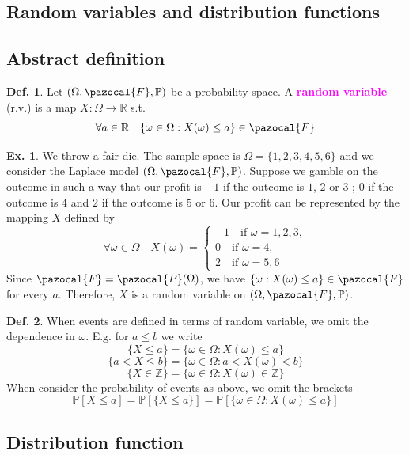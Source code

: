 \documentclass[8pt,a4paper,landscape]{article}
\theoremstyle{definition}
\newtheorem{definition}{Def.}[section]
\theoremstyle{example}
\newtheorem{example}{Ex.}[section]
\theoremstyle{intuition}
\theoremstyle{definition}
\newcommand{\Fb}{\pazocal{F}}
\newcommand{\Pb}{\pazocal{P}}
\newcommand{\mydef}[1]{\textcolor{magenta}{\textbf{#1}}}
\newcommand{\prob}[1]{\mathbb{P}\left[ #1 \right]}
\begin{document}
\begin{multicols}{3}
	\newpage
	\section{Random variables and distribution functions}
			\subsection{Abstract definition}
			
				\begin{definition}
					Let $(\Omega, \Fb, \mathbb{P})$ be a probability space. A \mydef{random variable} (r.v.) is a map $X : \Omega \to \mathbb{R}$ s.t.
					$$						
						\forall a \in \mathbb{R} \quad \{\omega \in \Omega : X(\omega) \leq a\} \in \Fb
					$$
				\end{definition}
				
				\begin{example}
					We throw a fair die. The sample space is $\Omega = \{1,2,3,4,5,6\}$ and we consider the Laplace model $(\Omega, \Fb, \mathbb{P})$. Suppose we gamble on the outcome in such a way that our profit is $-1$ if the outcome is $1$, $2$ or $3$ ; $0$ if the outcome is $4$ and $2$ if the outcome is $5$ or $6$. Our profit can be represented by the mapping $X$ defined by 
					$$
						\forall \omega \in \Omega \quad X(\omega) = \begin{cases}
							-1 \quad \text{if } \omega = 1,2,3, \\
							0 \quad \text{if } \omega = 4, \\
							2 \quad \text{if } \omega = 5,6
						\end{cases}
					$$
					Since $\Fb = \Pb(\Omega)$, we have $\{\omega : X(\omega) \leq a\} \in \Fb$ for every $a$. Therefore, $X$ is a random variable on $(\Omega, \Fb, \mathbb{P})$.
				\end{example}
				
				\begin{definition}
					When events are defined in terms of random variable, we omit the dependence in $\omega$. E.g. for $a \leq b$ we write 
					$$\{X \leq a\} = \{\omega \in \Omega : X(\omega) \leq a\}$$
					$$\{a < X \leq b\} = \{\omega \in \Omega : a < X(\omega) < b\}$$
					$$\{X \in \mathbb{Z}\} = \{\omega \in \Omega : X(\omega) \in \mathbb{Z}\}$$
					When consider the probability of events as above, we omit the brackets 
					$$ \prob{X \leq a} = \prob{\{X \leq a\}} = \prob{\{\omega \in \Omega : X(\omega) \leq a\}}$$
				\end{definition}
				
			
			\subsection{Distribution function}
	
	
\end{multicols}	
\end{document}
